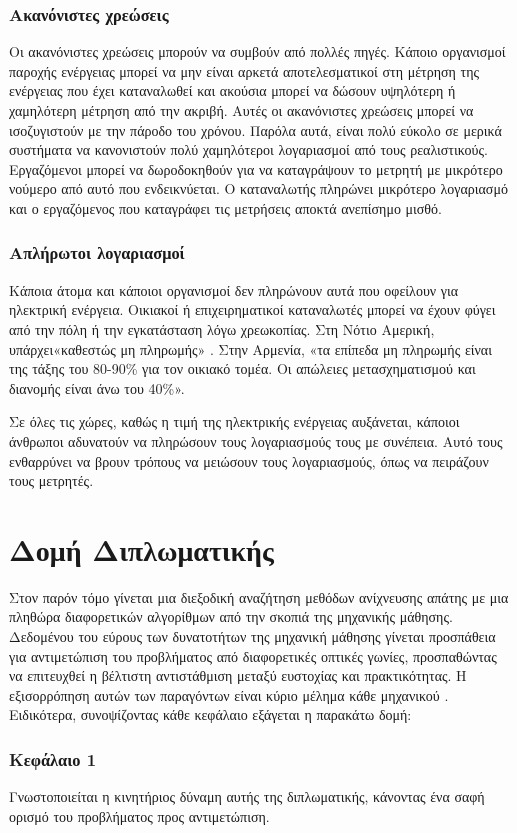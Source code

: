 \subsubsection{Ακανόνιστες χρεώσεις}
Οι ακανόνιστες χρεώσεις μπορούν να συμβούν από πολλές πηγές. Κάποιο οργανισμοί παροχής ενέργειας μπορεί να μην είναι αρκετά αποτελεσματικοί στη μέτρηση της ενέργειας που έχει καταναλωθεί και ακούσια μπορεί να δώσουν υψηλότερη ή χαμηλότερη μέτρηση από την ακριβή. Αυτές οι ακανόνιστες χρεώσεις μπορεί να ισοζυγιστούν με την πάροδο του χρόνου. Παρόλα αυτά, είναι πολύ εύκολο σε μερικά συστήματα να κανονιστούν πολύ χαμηλότεροι λογαριασμοί από τους ρεαλιστικούς. Εργαζόμενοι μπορεί να δωροδοκηθούν για να καταγράψουν το μετρητή με μικρότερο νούμερο από αυτό που ενδεικνύεται. Ο καταναλωτής πληρώνει μικρότερο λογαριασμό και ο εργαζόμενος που καταγράφει τις μετρήσεις αποκτά ανεπίσημο μισθό.
\subsubsection{Απλήρωτοι λογαριασμοί}
Κάποια άτομα και κάποιοι οργανισμοί δεν πληρώνουν αυτά που οφείλουν για ηλεκτρική ενέργεια. Οικιακοί ή επιχειρηματικοί καταναλωτές  μπορεί να έχουν φύγει από την πόλη ή την εγκατάσταση λόγω χρεωκοπίας. Στη Νότιο Αμερική, υπάρχει«καθεστώς μη πληρωμής» \cite{mkhwanazi}. Στην Αρμενία, «τα επίπεδα μη πληρωμής είναι της τάξης του 80-90\% για τον οικιακό τομέα. Οι απώλειες μετασχηματισμού και διανομής είναι άνω του 40\%»\cite{tacis}.\par
Σε όλες τις χώρες, καθώς η τιμή της ηλεκτρικής ενέργειας αυξάνεται, κάποιοι άνθρωποι αδυνατούν να πληρώσουν τους λογαριασμούς τους με συνέπεια. Αυτό τους ενθαρρύνει να βρουν τρόπους να μειώσουν τους λογαριασμούς, όπως να πειράζουν τους μετρητές.
\section{Δομή Διπλωματικής}
Στον παρόν τόμο γίνεται μια διεξοδική αναζήτηση μεθόδων ανίχνευσης απάτης με μια πληθώρα διαφορετικών αλγορίθμων από την σκοπιά της μηχανικής μάθησης. Δεδομένου του εύρους των δυνατοτήτων της μηχανική μάθησης γίνεται προσπάθεια για αντιμετώπιση του προβλήματος από διαφορετικές οπτικές γωνίες, προσπαθώντας να επιτευχθεί η βέλτιστη αντιστάθμιση μεταξύ ευστοχίας και πρακτικότητας. Η εξισορρόπηση αυτών των παραγόντων είναι κύριο μέλημα κάθε μηχανικού \cite{artoftradeoff}. Ειδικότερα, συνοψίζοντας κάθε κεφάλαιο εξάγεται η παρακάτω δομή:
\subsubsection{Κεφάλαιο 1}
Γνωστοποιείται η κινητήριος δύναμη αυτής της διπλωματικής, κάνοντας ένα σαφή ορισμό του προβλήματος προς αντιμετώπιση.
